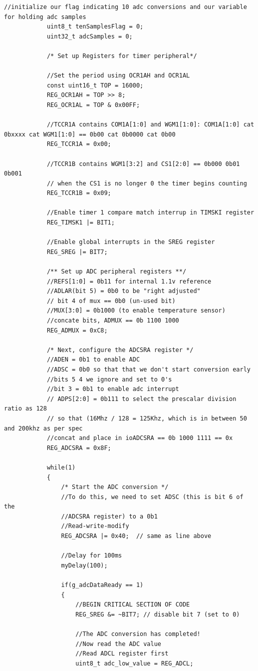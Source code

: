 \documentclass[11pt,pdftex,portrait,letterpaper]{article}
\begin{document}
\begin{lstlisting}[caption={Program 2}, label=l:programx]
			//initialize our flag indicating 10 adc conversions and our variable for holding adc samples
			uint8_t tenSamplesFlag = 0;
			uint32_t adcSamples = 0;
			
			/* Set up Registers for timer peripheral*/
			
			//Set the period using OCR1AH and OCR1AL
			const uint16_t TOP = 16000;
			REG_OCR1AH = TOP >> 8;
			REG_OCR1AL = TOP & 0x00FF;
			
			//TCCR1A contains COM1A[1:0] and WGM1[1:0]: COM1A[1:0] cat 0bxxxx cat WGM1[1:0] == 0b00 cat 0b0000 cat 0b00
			REG_TCCR1A = 0x00;
			
			//TCCR1B contains WGM1[3:2] and CS1[2:0] == 0b000 0b01 0b001
			// when the CS1 is no longer 0 the timer begins counting
			REG_TCCR1B = 0x09;
			
			//Enable timer 1 compare match interrup in TIMSKI register
			REG_TIMSK1 |= BIT1;
			
			//Enable global interrupts in the SREG register
			REG_SREG |= BIT7;
			
			/** Set up ADC peripheral registers **/
			//REFS[1:0] = 0b11 for internal 1.1v reference
			//ADLAR(bit 5) = 0b0 to be "right adjusted"
			// bit 4 of mux == 0b0 (un-used bit)
			//MUX[3:0] = 0b1000 (to enable temperature sensor)
			//concate bits, ADMUX == 0b 1100 1000
			REG_ADMUX = 0xC8;
			
			/* Next, configure the ADCSRA register */
			//ADEN = 0b1 to enable ADC
			//ADSC = 0b0 so that that we don't start conversion early
			//bits 5 4 we ignore and set to 0's
			//bit 3 = 0b1 to enable adc interrupt
			// ADPS[2:0] = 0b111 to select the prescalar division ratio as 128
			// so that (16Mhz / 128 = 125Khz, which is in between 50 and 200khz as per spec
			//concat and place in ioADCSRA == 0b 1000 1111 == 0x
			REG_ADCSRA = 0x8F;
			
			while(1)
			{
				/* Start the ADC conversion */
				//To do this, we need to set ADSC (this is bit 6 of the
				//ADCSRA register) to a 0b1
				//Read-write-modify
				REG_ADCSRA |= 0x40;  // same as line above
				
				//Delay for 100ms
				myDelay(100);
				
				if(g_adcDataReady == 1)
				{
					//BEGIN CRITICAL SECTION OF CODE
					REG_SREG &= ~BIT7; // disable bit 7 (set to 0)
					
					//The ADC conversion has completed!
					//Now read the ADC value
					//Read ADCL register first
					uint8_t adc_low_value = REG_ADCL;
					

\end{lstlisting}
\end{document}
